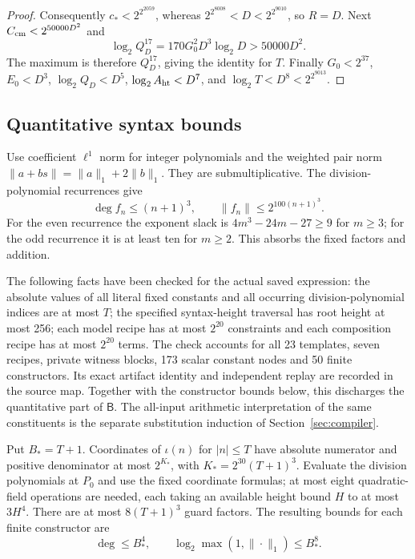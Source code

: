 \documentclass[11pt]{article}
\theoremstyle{definition}
\theoremstyle{remark}
\begin{document}
\begin{proof}
Consequently $c_*<2^{2^{2059}}$, whereas
$2^{2^{8008}}<D<2^{2^{9010}}$, so $R=D$.
Next $C_{\rm cm}<2^{50000D^2}$ and
\[
 \log_2Q_D^{17}=170G_0^2D^3\log_2D>50000D^2.
\]
The maximum is therefore $Q_D^{17}$, giving the identity for $T$.
Finally $G_0<2^{37}$, $E_0<D^3$, $\log_2Q_D<D^5$,
$\log_2A_{\rm ht}<D^7$, and $\log_2T<D^8<2^{2^{9013}}$.
\end{proof}

\subsection{Quantitative syntax bounds}
Use coefficient $\ell^1$ norm for integer polynomials and the weighted
pair norm $\|a+bs\|=\|a\|_1+2\|b\|_1$. They are submultiplicative.
The division-polynomial recurrences give
\[
 \deg f_n\le(n+1)^3,\qquad\|f_n\|\le2^{100(n+1)^3}.
\]
For the even recurrence the exponent slack is
$4m^3-24m-27\ge9$ for $m\ge3$; for the odd recurrence it is at least
ten for $m\ge2$. This absorbs the fixed factors and addition.

The following facts have been checked for the actual saved expression:
the absolute values of all literal fixed constants and all occurring
division-polynomial indices are at most $T$; the specified syntax-height
traversal has root height at most 256; each model recipe has at most
$2^{20}$ constraints and each composition recipe has at most $2^{20}$
terms. The check accounts for all 23 templates, seven recipes, private
witness blocks, 173 scalar constant nodes and 50 finite constructors. Its exact
artifact identity and independent replay are recorded in the source map.
Together with the constructor bounds below, this discharges the
quantitative part of $\mathsf B$. The all-input arithmetic interpretation of the same constituents is the
separate substitution induction of Section~\ref{sec:compiler}.

Put $B_*=T+1$. Coordinates of $\iota(n)$ for
$|n|\le T$ have absolute numerator and positive denominator at most $2^{K_*}$, with
$K_*=2^{30}(T+1)^3$. Evaluate the division polynomials at $P_0$ and use
the fixed coordinate formulas; at most eight quadratic-field operations
are needed, each taking an available height bound $H$ to at most $3H^4$.
There are at most $8(T+1)^3$ guard factors. The resulting bounds for
each finite constructor are
\[
 \deg\le B_*^4,\qquad\log_2\max(1,\|\cdot\|_1)\le B_*^8.
\]
\end{document}
